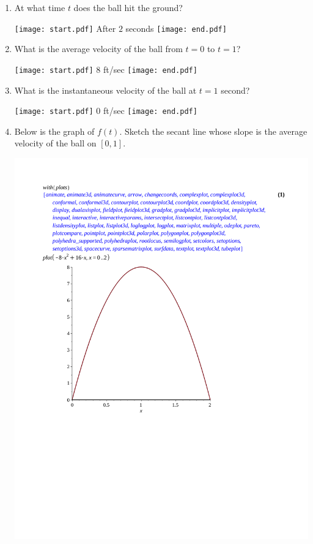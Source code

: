 \documentclass[12pt]{article}
\begin{document}
\begin{enumerate}
\begin{enumerate}

\item  At what time $t$ does the ball hit the ground? 

\texttt{[image: start.pdf]}
{{After $2$ seconds}}
\texttt{[image: end.pdf]}


\item What is the average velocity of the ball from $t=0$ to $t=1$? 

\texttt{[image: start.pdf]}
{{8 ft/sec}}
\texttt{[image: end.pdf]}


\item What is the instantaneous velocity of the ball at $t=1$ second?

\texttt{[image: start.pdf]}
{{0 ft/sec}}
\texttt{[image: end.pdf]}
 

\item Below is the graph of $f(t)$.  Sketch the secant line whose slope is the average velocity of the ball on $[0,1]$.\\

\begin{center}
\includegraphics[scale=0.5]{graph2.pdf}
\end{center} 


\end{enumerate}
\end{enumerate}
\end{document}
